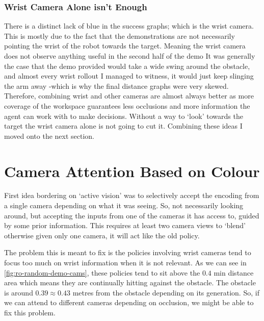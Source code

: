 \subsubsection{Wrist Camera Alone isn't Enough}
There is a distinct lack of blue in the success graphs; which is the wrist camera. This is mostly due to the fact that the demonstrations are not necessarily pointing the wrist of the robot towards the target. Meaning the wrist camera does not observe anything useful in the second half of the demo
It was generally the case that the demo provided would take a wide swing around the obstacle, and almost every wrist rollout I managed to witness, it would just keep slinging the arm away -which is why the final distance graphs were very skewed. Therefore, combining wrist and other cameras are almost always better as more coverage of the workspace guarantees less occlusions and more information the agent can work with to make decisions. Without a way to `look' towards the target the wrist camera alone is not going to cut it. Combining these ideas I moved onto the next section.

\section{Camera Attention Based on Colour}\label{sec:reach-obs-naive-cam-attn}
First idea bordering on `active vision' was to selectively accept the encoding from a single camera depending on what it was seeing. So, not necessarily looking around, but accepting the inputs from one of the cameras it has access to, guided by some prior information. This requires at least two camera views to `blend' otherwise given only one camera, it will act like the old policy.

The problem this is meant to fix is the policies involving wrist cameras tend to focus too much on wrist information when it is not relevant. As we can see in \ref{fig:ro-random-demo-cams}, these policies tend to sit above the $0.4$ min distance area which means they are continually hitting against the obstacle. The obstacle is around $0.39 \approx 0.43$ metres from the obstacle depending on its generation. So, if we can attend to different cameras depending on occlusion, we might be able to fix this problem.

